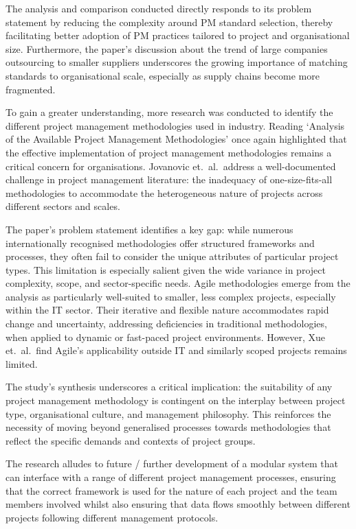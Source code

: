 \documentclass{report}
\begin{document}
The analysis and comparison conducted directly responds to its problem statement by reducing the complexity around PM standard selection, thereby facilitating better adoption of PM practices tailored to project and organisational size. 
Furthermore, the paper's discussion about the trend of large companies outsourcing to smaller suppliers underscores the growing importance of matching standards to organisational scale, especially as supply chains become more fragmented.

To gain a greater understanding, more research was conducted to identify the different project management methodologies used in industry. 
Reading `Analysis of the Available Project Management Methodologies' \parencite{jovanovicAnalysisAvailableProject2018} once again highlighted that the effective implementation of project management methodologies remains a critical concern for organisations. 
Jovanovic et.\ al.\ address a well-documented challenge in project management literature: the inadequacy of one-size-fits-all methodologies to accommodate the heterogeneous nature of projects across different sectors and scales.

The paper's problem statement identifies a key gap: while numerous internationally recognised methodologies offer structured frameworks and processes, they often fail to consider the unique attributes of particular project types. 
This limitation is especially salient given the wide variance in project complexity, scope, and sector-specific needs. 
Agile methodologies emerge from the analysis as particularly well-suited to smaller, less complex projects, especially within the IT sector. 
Their iterative and flexible nature accommodates rapid change and uncertainty, addressing deficiencies in traditional methodologies, when applied to dynamic or fast-paced project environments. 
However, Xue et.\ al.\ find Agile's applicability outside IT and similarly scoped projects remains limited.

The study's synthesis underscores a critical implication: the suitability of any project management methodology is contingent on the interplay between project type, organisational culture, and management philosophy.
This reinforces the necessity of moving beyond generalised processes towards methodologies that reflect the specific demands and contexts of project groups.  

The research alludes to future / further development of a modular system that can interface with a range of different project management processes, ensuring that the correct framework is used for the nature of each project and the team members involved whilst also ensuring that data flows smoothly between different projects following different management protocols.
\end{document}

